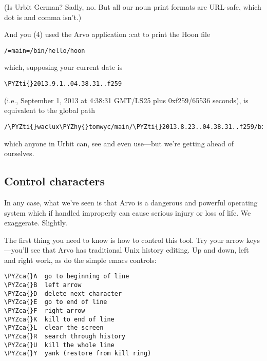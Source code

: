 (Is Urbit German?  Sadly, no.  But all our noun print formats are
URL-safe, which dot is and comma isn't.)

And you (4) used the Arvo application :cat to print the Hoon file

\begin{framed_shaded}
\begin{Verbatim}[fontsize=\relsize{-2.5},fontseries=b,commandchars=\\\{\}]
/=main=/bin/hello/hoon
\end{Verbatim}
\end{framed_shaded}

which, supposing your current date is

\begin{framed_shaded}
\begin{Verbatim}[fontsize=\relsize{-2.5},fontseries=b,commandchars=\\\{\}]
\PYZti{}2013.9.1..04.38.31..f259
\end{Verbatim}
\end{framed_shaded}

(i.e., September 1, 2013 at 4:38:31 GMT/LS25 plus 0xf259/65536
seconds), is equivalent to the global path

\begin{framed_shaded}
\begin{Verbatim}[fontsize=\relsize{-2.5},fontseries=b,commandchars=\\\{\}]
/\PYZti{}waclux\PYZhy{}tomwyc/main/\PYZti{}2013.8.23..04.38.31..f259/bin/hello/hoon
\end{Verbatim}
\end{framed_shaded}

which anyone in Urbit can, see and even use---but we're getting
ahead of ourselves.

\subsection{Control characters}

In any case, what we've seen is that Arvo is a dangerous and
powerful operating system which if handled improperly can cause
serious injury or loss of life.  We exaggerate.  Slightly.

The first thing you need to know is how to control this tool.
Try your arrow keys---you'll see that Arvo has traditional Unix
history editing.  Up and down, left and right work, as do the
simple emacs controls:

\begin{framed_shaded}
\begin{Verbatim}[fontsize=\relsize{-2.5},fontseries=b,commandchars=\\\{\}]
\PYZca{}A  go to beginning of line
\PYZca{}B  left arrow
\PYZca{}D  delete next character
\PYZca{}E  go to end of line
\PYZca{}F  right arrow
\PYZca{}K  kill to end of line
\PYZca{}L  clear the screen
\PYZca{}R  search through history
\PYZca{}U  kill the whole line
\PYZca{}Y  yank (restore from kill ring)
\end{Verbatim}
\end{framed_shaded}

